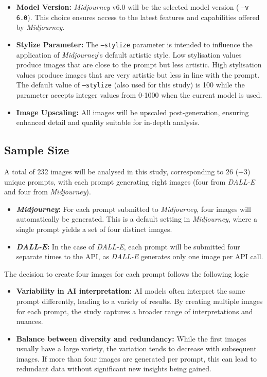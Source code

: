 \begin{itemize}
\item \textbf{Model Version:} \textit{Midjourney} v6.0 will be the selected model version ( \texttt{--v 6.0}). This choice ensures access to the latest features and capabilities offered by \textit{Midjourney}.
\item \textbf{Stylize Parameter:}  The \texttt{--stylize} parameter is intended to influence the application of \textit{Midjourney}'s default artistic style. Low stylisation values produce images that are close to the prompt but less artistic. High stylisation values produce images that are very artistic but less in line with the prompt. The default value of \texttt{--stylize} (also used for this study) is 100 while the parameter accepts integer values from 0-1000 when the current model is used.
\item \textbf{Image Upscaling:} All images will be upscaled post-generation, ensuring enhanced detail and quality suitable for in-depth analysis.
\end{itemize}

\subsection{Sample Size}

A total of 232 images will be analysed in this study, corresponding to 26 (+3) unique prompts, with each prompt generating eight images (four from \textit{DALL-E} and four from \textit{Midjourney}).

\begin{itemize}
\item \textbf{\textit{Midjourney}:} For each prompt submitted to \textit{Midjourney}, four images will automatically be generated. This is a default setting in \textit{Midjourney}, where a single prompt yields a set of four distinct images.
\item \textbf{\textit{DALL-E}:} In the case of \textit{DALL-E}, each prompt will be submitted four separate times to the API, as \textit{DALL-E} generates only one image per API call.
\end{itemize}

The decision to create four images for each prompt follows the following logic

\begin{itemize}
\item \textbf{Variability in AI interpretation:} AI models often interpret the same prompt differently, leading to a variety of results. By creating multiple images for each prompt, the study captures a broader range of interpretations and nuances.
\item \textbf{Balance between diversity and redundancy:} While the first images usually have a large variety, the variation tends to decrease with subsequent images. If more than four images are generated per prompt, this can lead to redundant data without significant new insights being gained.
\end{itemize}

